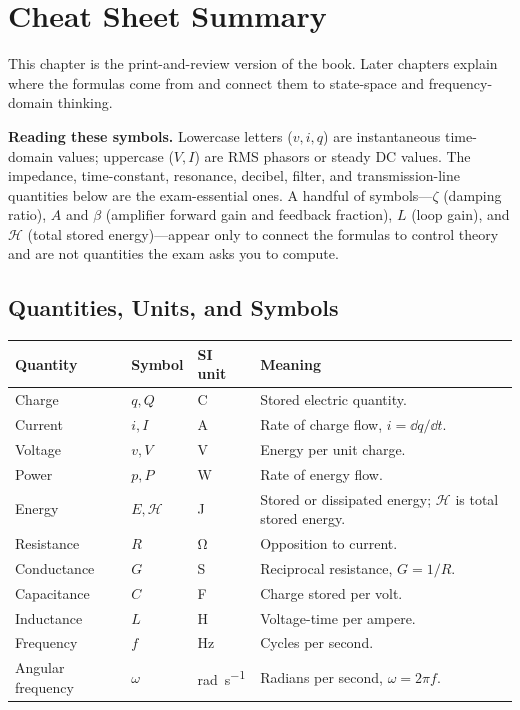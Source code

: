 \chapter{Cheat Sheet Summary}
This chapter is the print-and-review version of the book. Later chapters explain
where the formulas come from and connect them to state-space and
frequency-domain thinking.

\textbf{Reading these symbols.} Lowercase letters (\(v,i,q\)) are instantaneous
time-domain values; uppercase (\(V,I\)) are RMS phasors or steady DC values. The
impedance, time-constant, resonance, decibel, filter, and transmission-line
quantities below are the exam-essential ones. A handful of symbols---\(\zeta\)
(damping ratio), \(A\) and \(\beta\) (amplifier forward gain and feedback
fraction), \(L\) (loop gain), and \(\mathcal{H}\) (total stored energy)---appear
only to connect the formulas to control theory and are not quantities the exam
asks you to compute.

\section{Quantities, Units, and Symbols}
\begin{tabularx}{\textwidth}{@{}L{0.19\textwidth}L{0.13\textwidth}L{0.16\textwidth}Y@{}}
\toprule
Quantity & Symbol & SI unit & Meaning \\
\midrule
Charge & \(q,Q\) & \si{\coulomb} & Stored electric quantity. \\
Current & \(i,I\) & \si{\ampere} & Rate of charge flow, \(i=\dd q/\dd t\). \\
Voltage & \(v,V\) & \si{\volt} & Energy per unit charge. \\
Power & \(p,P\) & \si{\watt} & Rate of energy flow. \\
Energy & \(E,\mathcal{H}\) & \si{\joule} & Stored or dissipated energy; \(\mathcal{H}\) is total stored energy. \\
Resistance & \(R\) & \si{\ohm} & Opposition to current. \\
Conductance & \(G\) & \si{\siemens} & Reciprocal resistance, \(G=1/R\). \\
Capacitance & \(C\) & \si{\farad} & Charge stored per volt. \\
Inductance & \(L\) & \si{\henry} & Voltage-time per ampere. \\
Frequency & \(f\) & \si{\hertz} & Cycles per second. \\
Angular frequency & \(\omega\) & \si{\radian\per\second} & Radians per second, \(\omega=2\pi f\). \\
\bottomrule
\end{tabularx}


